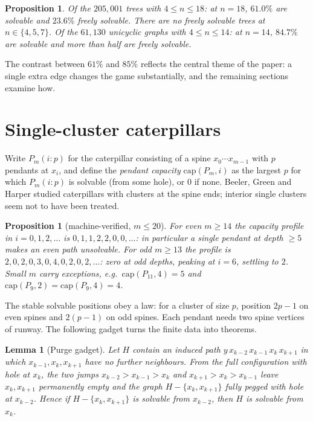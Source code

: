 \documentclass[11pt]{article}
\newtheorem{lemma}[theorem]{Lemma}
\newtheorem{proposition}[theorem]{Proposition}
\theoremstyle{definition}
\newcommand{\cp}{\mathrm{cap}}
\begin{document}
\begin{proposition}\label{prop:atlas}
Of the $205{,}001$ trees with $4\le n\le 18$: at $n=18$, $61.0\%$
are solvable and $23.6\%$ freely solvable. There are no freely
solvable trees at $n\in\{4,5,7\}$. Of the $61{,}130$ unicyclic
graphs with $4\le n\le 14$: at $n=14$, $84.7\%$ are solvable and
more than half are freely solvable.
\end{proposition}

The contrast between $61\%$ and $85\%$ reflects the central theme of
the paper: a single extra edge changes the game substantially, and
the remaining sections examine how.

\section{Single-cluster caterpillars}\label{sec:caterpillar}

Write $P_m(i\!:\!p)$ for the caterpillar consisting of a spine
$x_0\cdots x_{m-1}$ with $p$ pendants at $x_i$, and define the
\emph{pendant capacity} $\cp(P_m,i)$ as the largest $p$ for which
$P_m(i\!:\!p)$ is solvable (from some hole), or $0$ if none.
Beeler, Green and Harper \cite{BGH17} studied caterpillars with
clusters at the spine ends; interior single clusters seem not to have
been treated.

\begin{proposition}[machine-verified, $m\le 20$]\label{prop:cap}
For even $m\ge 14$ the capacity profile in $i=0,1,2,\dots$ is
$0,1,1,2,2,0,0,\dots$: in particular a single pendant at depth
$\ge 5$ makes an even path unsolvable. For odd $m\ge 13$ the profile
is $2,0,2,0,3,0,4,0,2,0,2,\dots$: zero at odd depths, peaking at
$i=6$, settling to $2$. Small $m$ carry exceptions, e.g.\
$\cp(P_{11},4)=5$ and $\cp(P_9,2)=\cp(P_9,4)=4$.
\end{proposition}

The stable solvable positions obey a law: for a cluster of size $p$,
position $2p-1$ on even spines and $2(p-1)$ on odd spines. Each
pendant needs two spine vertices of runway. The following gadget
turns the finite data into theorems.

\begin{lemma}[Purge gadget]\label{lem:purge}
Let $H$ contain an induced path $y\,x_{k-2}\,x_{k-1}\,x_k\,x_{k+1}$
in which $x_{k-1},x_k,x_{k+1}$ have no further neighbours. From the
full configuration with hole at $x_k$, the two jumps
$x_{k-2}\!>\!x_{k-1}\!>\!x_k$ and $x_{k+1}\!>\!x_k\!>\!x_{k-1}$
leave $x_k,x_{k+1}$ permanently empty and the graph
$H-\{x_k,x_{k+1}\}$ fully pegged with hole at $x_{k-2}$. Hence if
$H-\{x_k,x_{k+1}\}$ is solvable from $x_{k-2}$, then $H$ is solvable
from $x_k$.
\end{lemma}
\end{document}
